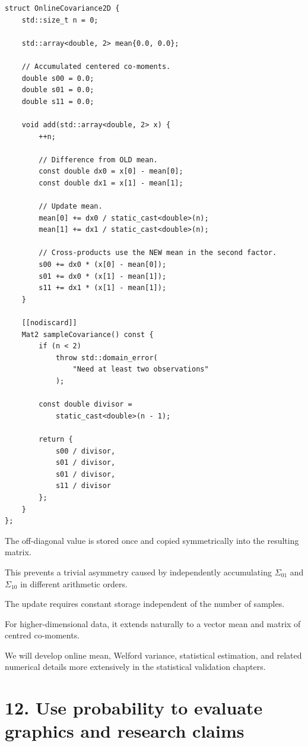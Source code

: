 \begin{verbatim}
struct OnlineCovariance2D {
    std::size_t n = 0;

    std::array<double, 2> mean{0.0, 0.0};

    // Accumulated centered co-moments.
    double s00 = 0.0;
    double s01 = 0.0;
    double s11 = 0.0;

    void add(std::array<double, 2> x) {
        ++n;

        // Difference from OLD mean.
        const double dx0 = x[0] - mean[0];
        const double dx1 = x[1] - mean[1];

        // Update mean.
        mean[0] += dx0 / static_cast<double>(n);
        mean[1] += dx1 / static_cast<double>(n);

        // Cross-products use the NEW mean in the second factor.
        s00 += dx0 * (x[0] - mean[0]);
        s01 += dx0 * (x[1] - mean[1]);
        s11 += dx1 * (x[1] - mean[1]);
    }

    [[nodiscard]]
    Mat2 sampleCovariance() const {
        if (n < 2)
            throw std::domain_error(
                "Need at least two observations"
            );

        const double divisor =
            static_cast<double>(n - 1);

        return {
            s00 / divisor,
            s01 / divisor,
            s01 / divisor,
            s11 / divisor
        };
    }
};
\end{verbatim}

The off-diagonal value is stored once and copied symmetrically into the resulting matrix.

This prevents a trivial asymmetry caused by independently accumulating \(\Sigma_{01}\) and \(\Sigma_{10}\) in different arithmetic orders.

The update requires constant storage independent of the number of samples.

For higher-dimensional data, it extends naturally to a vector mean and matrix of centred co-moments.

We will develop online mean, Welford variance, statistical estimation, and related numerical details more extensively in the statistical validation chapters.

\section{12. Use probability to evaluate graphics and research claims}\label{02-foundations-ii-ch031-use-probability-to-evaluate-graphics-and-research-claims}

